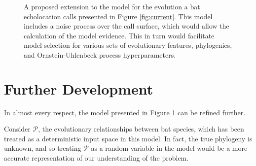 \documentclass[]{article}
\begin{document}
\begin{figure}[htbp]
\centering
{}
\caption{A proposed extension to the model for the evolution a bat echolocation calls presented in Figure \ref{fig:current}. This model includes a noise process over the call surface, which would allow the calculation of the model evidence. This in turn would facilitate model selection for various sets of evolutionary features, phylogenies, and Ornstein-Uhlenbeck process hyperparameters.}
\label{fig:joint}
\end{figure}

\section{Further Development}

In almost every respect, the model presented in Figure \ref{fig:joint} can be refined further.

Consider \(\mathcal{P}\), the evolutionary relationships between bat species, which has been treated as a deterministic input space in this model. In fact, the true phylogeny is unknown, and so treating \(\mathcal{P}\) as a random variable in the model would be a more accurate representation of our understanding of the problem. 
\end{document}
